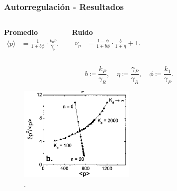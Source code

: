 \documentclass[10pt]{beamer}
\begin{document}
\begin{frame}
\frametitle{Autorregulaci\'on - Resultados}
\begin{columns}[c]

\centering \textbf{Promedio}
\begin{align*}
\langle p \rangle &= \frac{1}{1+b\phi} \cdot \frac{k_0b}{\gamma_p}.
\end{align*}

\centering \textbf{Ruido}
\begin{align*}
\nu_p &= \frac{1-\phi}{1+b\phi} \cdot \frac{b}{1+\eta}+1.
\end{align*}
\end{columns}

\vspace{3 mm}

\begin{equation*}
  b \coloneqq \frac{k_P}{\gamma_R}, \quad \eta \coloneqq \frac{\gamma_P}{\gamma_R}, \quad \phi \coloneqq \frac{k_1}{\gamma_P}.
\end{equation*}

\begin{figure}[p]
    \centering
    \includegraphics[width=0.5\textwidth]{graph5.png}\\
    \tiny \cite{thattai01}.
\end{figure}

\end{frame}
\end{document}
